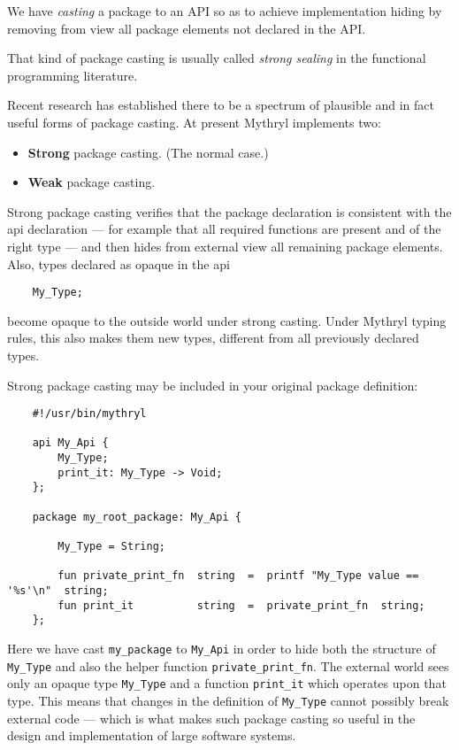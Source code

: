 We have 
{\it casting} a package to an API so as to achieve implementation hiding by 
removing from view all package elements not declared in the API.

That kind of package casting is usually called {\it strong sealing} in the 
functional programming literature.

Recent research has established there to be a spectrum of plausible and in 
fact useful forms of package casting.  At present Mythryl implements two: 
\begin{itemize}
\item {\bf Strong} package casting.  (The normal case.)
\item {\bf Weak} package casting.
\end{itemize}

Strong package casting verifies that the package declaration is consistent 
with the api declaration --- for example that all required functions are present 
and of the right type --- and then hides from external view all remaining package elements.
Also, types declared as opaque in the api

\begin{verbatim}
    My_Type;
\end{verbatim}

become opaque to the outside world under strong casting.  Under Mythryl typing 
rules, this also makes them new types, different from all previously declared types.

Strong package casting may be included in your original package definition:

\begin{verbatim}
    #!/usr/bin/mythryl

    api My_Api {
        My_Type;
        print_it: My_Type -> Void;
    };

    package my_root_package: My_Api {

        My_Type = String;

        fun private_print_fn  string  =  printf "My_Type value == '%s'\n"  string;
        fun print_it          string  =  private_print_fn  string;
    };
\end{verbatim}

Here we have cast {\tt my\_package} to {\tt My\_Api} in order to hide 
both the structure of {\tt My\_Type} and also the helper function 
{\tt private\_print\_fn}.  The external world sees only an 
opaque type {\tt My\_Type} and a function {\tt print\_it} which operates 
upon that type.  This means that changes in the definition of {\tt My\_Type} 
cannot possibly break external code --- which is what makes such package casting 
so useful in the design and implementation of large software systems.

